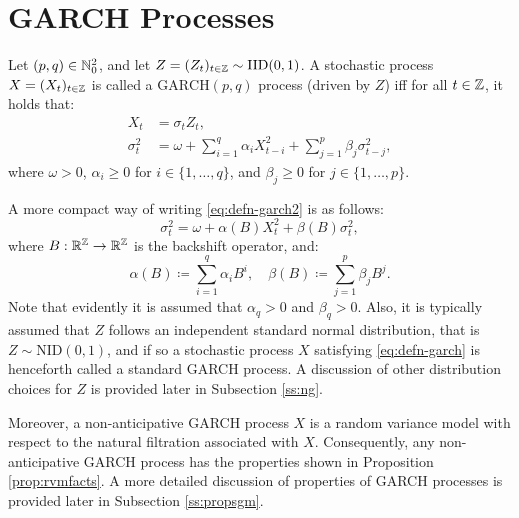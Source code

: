 \section{GARCH Processes}
\begin{defn}\label{defn:garch}
Let $(p,q)\in\mathbb{N}_{0}^{2}$, and let $Z=(Z_{t})_{t\in\mathbb{Z}}\sim\mathrm{IID}(0,1)$. A stochastic process $X=(X_{t})_{t\in\mathbb{Z}}$ is called a $\mathrm{GARCH}(p,q)$ process (driven by $Z$) iff for all $t\in\mathbb{Z}$, it holds that:
\begin{subequations}\label{eq:defn-garch}
\begin{align}
    X_{t}&=\sigma_{t}Z_{t}, \label{eq:defn-garch1}\\
    \sigma_{t}^{2}&=\omega+\sum_{i=1}^{q}\alpha_{i}X_{t-i}^{2}+\sum_{j=1}^{p}\beta_{j}\sigma_{t-j}^{2}\label{eq:defn-garch2},
\end{align}
\end{subequations}
where $\omega>0$, $\alpha_{i}\geq0$ for $i\in\{1,\dots,q\}$, and $\beta_{j}\geq0$ for $j\in\{1,\dots,p\}$.
\end{defn}
A more compact way of writing \eqref{eq:defn-garch2} is as follows:
\begin{equation}\label{eq:jalskdjaslkd}
    \sigma_{t}^{2}=\omega+\alpha(B)X_{t}^{2}+\beta(B)\sigma_{t}^{2},
\end{equation}
where $B:\mathbb{R}^{\mathbb{Z}}\to\mathbb{R}^{\mathbb{Z}}$ is the backshift operator, and:
\begin{equation*}
    \alpha(B)\coloneqq\sum_{i=1}^{q}\alpha_{i}B^{i},\quad
    \beta(B)\coloneqq\sum_{j=1}^{p}\beta_{j}B^{j}.
\end{equation*}
Note that evidently it is assumed that $\alpha_{q}>0$ and $\beta_{q}>0$. Also, it is typically assumed that $Z$ follows an independent standard normal distribution, that is $Z\sim\mathrm{NID}(0,1)$, and if so a stochastic process $X$ satisfying \eqref{eq:defn-garch} is henceforth called a standard GARCH process. A discussion of other distribution choices for $Z$ is provided later in Subsection \ref{ss:ng}.

Moreover, a non-anticipative GARCH process $X$ is a random variance model with respect to the natural filtration associated with $X$. Consequently, any non-anticipative GARCH process has the properties shown in Proposition \ref{prop:rvmfacts}. A more detailed discussion of properties of GARCH processes is provided later in Subsection \ref{ss:propsgm}.

